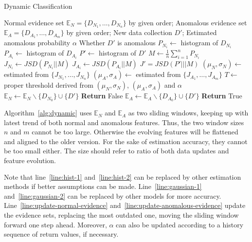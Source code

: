 \documentclass[10pt,conference,letterpaper]{IEEEtran}
\begin{document}
			\begin{algorithm}[!t]
				\caption{Dynamic Classification}
				\label{alg:dynamic}
				\begin{algorithmic}[1]
					\Require Normal evidence set $\mathbb{E}_N = \{D_{N_1}, \dots, D_{N_n}\}$ by given order; Anomalous evidence set $\mathbb{E}_A = \{D_{A_1}, \dots, D_{A_m}\}$ by given order; New data collection $D'$; Estimated anomalous probability $\alpha$
					\Ensure Whether $D'$ is anomalous
					\State $P_{N_i} \gets$ histogram of $D_{N_i}$\label{line:hist-1}
					\EndFor
					\State $P_{A_i} \gets$ histogram of $D_{A_i}$\label{line:hist-2}
					\EndFor
					\State $P' \gets$ histogram of $D'$
					\State $M \gets \frac{1}{n}\sum_{i=1}^{n}P_{N_i}$
					\State $J_{N_i} \gets JSD(P_{N_i}||M)$
					\EndFor
					\State $J_{A_i} \gets JSD(P_{A_i}||M)$
					\EndFor
					\State $J' = JSD(P'|||M)$
					\State $(\mu_N, \sigma_N) \gets$ estimated from $\{J_{N_1}, \dots, J_{N_n}\}$\label{line:gaussian-1}
					\State $(\mu_A, \sigma_A) \gets$ estimated from $\{J_{A_1}, \dots, J_{A_m}\}$\label{line:gaussian-2}
					\State $T \gets$ proper threshold derived from $(\mu_N, \sigma_N)$, $(\mu_A, \sigma_A)$ and $\alpha$
					\State $\mathbb{E}_N \gets \mathbb{E}_N \backslash \{D_{N_0}\} \cup \{D'\}$\label{line:update-normal-evidence}
					\State \textbf{Return} False
					\Else
					\State $\mathbb{E}_A \gets \mathbb{E}_A \backslash \{D_{A_0}\} \cup \{D'\}$\label{line:update-anomalous-evidence}
					\State \textbf{Return} True
					\EndIf
				\end{algorithmic}
			\end{algorithm}
	
			Algorithm~\ref{alg:dynamic} uses $\mathbb{E}_N$ and $\mathbb{E}_A$ as two sliding windows, keeping up with latest trend of both normal and anomalous features. Thus, the two window sizes $n$ and $m$ cannot be too large. Otherwise the evolving features will be flattened and aligned to the older version. For the sake of estimation accuracy, they cannot be too small either. The size should refer to ratio of both data updates and feature evolution.
			
			Note that line~\ref{line:hist-1} and~\ref{line:hist-2} can be replaced by other estimation methods if better assumptions can be made. Line~\ref{line:gaussian-1} and~\ref{line:gaussian-2} can be replaced by other models for more accuracy. Line~\ref{line:update-normal-evidence} and~\ref{line:update-anomalous-evidence} update the evidence sets, replacing the most outdated one, moving the sliding window forward one step ahead. Moreover, $\alpha$ can also be updated according to a history sequence of return values, if necessary.
	
\end{document}
